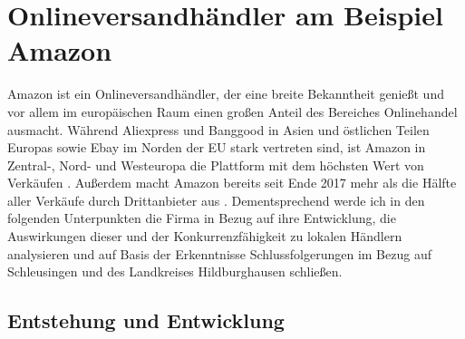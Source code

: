 \documentclass[a4paper, 12pt]{scrartcl}
\begin{document}
        \newpage
        
        
        
    \section{Onlineversandhändler am Beispiel Amazon} 
    
    
    
    
     Amazon ist ein Onlineversandhändler, der eine breite Bekanntheit genießt und vor allem im europäischen Raum einen großen Anteil des Bereiches Onlinehandel ausmacht. 
 Während Aliexpress und Banggood in Asien und östlichen Teilen Europas sowie Ebay im Norden der EU stark vertreten sind, ist Amazon in Zentral-, Nord- und Westeuropa die Plattform mit dem höchsten Wert von Verkäufen \cite[S. 22]{EuroCommerce}. Außerdem macht Amazon bereits seit Ende 2017 mehr als die Hälfte aller Verkäufe durch Drittanbieter aus \cite[S. 25]{Haendlerbund}. Dementsprechend werde ich in den folgenden Unterpunkten die Firma in Bezug auf ihre Entwicklung, die Auswirkungen dieser und der Konkurrenzfähigkeit zu lokalen Händlern analysieren und auf Basis der Erkenntnisse Schlussfolgerungen im Bezug auf Schleusingen und des Landkreises Hildburghausen schließen.

 
 
 
 
        \subsection{Entstehung und Entwicklung}
        
        
        
        
        
\end{document}
